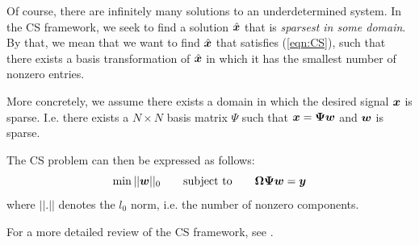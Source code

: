 Of course, there are infinitely many solutions to an underdetermined system.
In the CS framework, we seek to find a solution $\hat{\boldsymbol x}$ that is \emph{sparsest in some domain}.
By that, we mean that we want to find $\hat{\boldsymbol x}$ that satisfies (\ref{eqn:CS}), such that there exists a basis transformation of $\hat{\boldsymbol x}$ in which it has the smallest number of nonzero entries.

More concretely, we assume there exists a domain in which the desired signal $\boldsymbol x$ is sparse. 
I.e. there exists a $N\times N$ basis matrix $\Psi$ such that $\boldsymbol x = \boldsymbol\Psi \boldsymbol w$ and $\boldsymbol w$ is sparse.

The CS problem can then be expressed as follows:
\begin{equation}
\label{eqn:CSproblem}
\min||\boldsymbol w||_0 \qquad\mbox{subject to}\qquad \boldsymbol\Omega\boldsymbol\Psi\boldsymbol w = \boldsymbol y
\end{equation}
where $||.||$ denotes the $l_0$ norm, i.e. the number of nonzero components.

For a more detailed review of the CS framework, see \cite{candes2008}.

